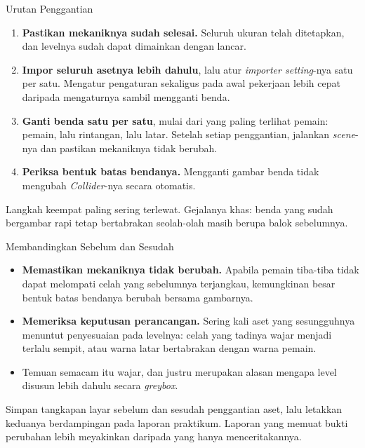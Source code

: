 \documentclass[aspectratio=169,10pt]{beamer}
\begin{document}
\begin{frame}{Urutan Penggantian}
\begin{enumerate}
  \item \textbf{Pastikan mekaniknya sudah selesai.} Seluruh ukuran telah
        ditetapkan, dan levelnya sudah dapat dimainkan dengan lancar.
  \item \textbf{Impor seluruh asetnya lebih dahulu}, lalu atur
        \emph{importer setting}-nya satu per satu. Mengatur pengaturan sekaligus
        pada awal pekerjaan lebih cepat daripada mengaturnya sambil mengganti
        benda.
  \item \textbf{Ganti benda satu per satu}, mulai dari yang paling terlihat
        pemain: pemain, lalu rintangan, lalu latar. Setelah setiap penggantian,
        jalankan \emph{scene}-nya dan pastikan mekaniknya tidak berubah.
  \item \textbf{Periksa bentuk batas bendanya.} Mengganti gambar benda tidak
        mengubah \emph{Collider}-nya secara otomatis.
\end{enumerate}
\vspace{0.10cm}
\begin{kotak}
Langkah keempat paling sering terlewat. Gejalanya khas: benda yang sudah
bergambar rapi tetap bertabrakan seolah-olah masih berupa balok sebelumnya.
\end{kotak}
\end{frame}

\begin{frame}{Membandingkan Sebelum dan Sesudah}
\begin{itemize}
  \item \textbf{Memastikan mekaniknya tidak berubah.} Apabila pemain tiba-tiba
        tidak dapat melompati celah yang sebelumnya terjangkau, kemungkinan
        besar bentuk batas bendanya berubah bersama gambarnya.
  \item \textbf{Memeriksa keputusan perancangan.} Sering kali aset yang
        sesungguhnya menuntut penyesuaian pada levelnya: celah yang tadinya
        wajar menjadi terlalu sempit, atau warna latar bertabrakan dengan
        warna pemain.
  \item Temuan semacam itu wajar, dan justru merupakan alasan mengapa level
        disusun lebih dahulu secara \emph{greybox}.
\end{itemize}
\vspace{0.10cm}
\begin{kiat}
Simpan tangkapan layar sebelum dan sesudah penggantian aset, lalu letakkan
keduanya berdampingan pada laporan praktikum. Laporan yang memuat bukti
perubahan lebih meyakinkan daripada yang hanya menceritakannya.
\end{kiat}
\end{frame}
\end{document}
